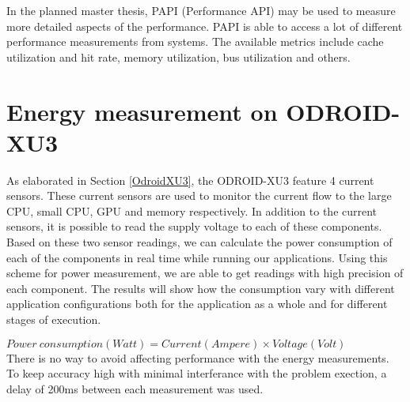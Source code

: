 In the planned master thesis, PAPI (Performance API) may be used to measure more detailed aspects of the performance.
PAPI is able to access a lot of different performance measurements from systems.
The available metrics include cache utilization and hit rate, memory utilization, bus utilization and others.

\section{Energy measurement on ODROID-XU3}
As elaborated in Section \ref{OdroidXU3}, the ODROID-XU3 feature 4 current sensors.
These current sensors are used to monitor the current flow to the large CPU, small CPU, GPU and memory respectively.
In addition to the current sensors, it is possible to read the supply voltage to each of these components.
Based on these two sensor readings, we can calculate the power consumption of each of the components in real time while running our applications.
Using this scheme for power measurement, we are able to get readings with high precision of each component.
The results will show how the consumption vary with different application configurations both for the application as a whole and for different stages of execution.

$ Power\ consumption (Watt) = Current (Ampere) \times Voltage (Volt) $
\\
There is no way to avoid affecting performance with the energy measurements.
To keep accuracy high with minimal interferance with the problem exection, a delay of 200ms between each measurement was used.
